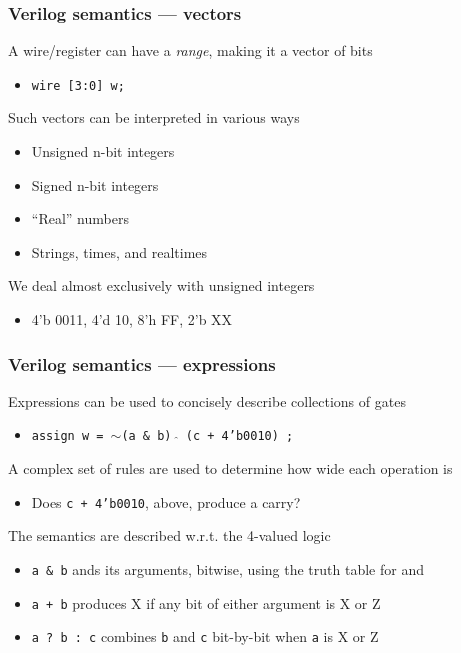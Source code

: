 \documentclass[mathserif]{beamer}
\begin{document}
\begin{frame}
\frametitle{Verilog semantics --- vectors}

A wire/register can have a {\em range}, making it a vector of bits
\begin{itemize}
\item \texttt{wire [3:0] w;}
\end{itemize}

\bigskip

Such vectors can be interpreted in various ways
\begin{itemize}
\item Unsigned n-bit integers
\item Signed n-bit integers
\item ``Real'' numbers
\item Strings, times, and realtimes
\end{itemize}

\bigskip

We deal almost exclusively with unsigned integers
\begin{itemize}
\item 4'b 0011, 4'd 10, 8'h FF, 2'b XX
\end{itemize}

\bigskip




\end{frame}


\begin{frame}
\frametitle{Verilog semantics --- expressions}

Expressions can be used to concisely describe collections of gates
\begin{itemize}
\item \texttt{assign w = $\sim$(a \& b) $\hat{}$ (c + 4'b0010) ;}
\end{itemize}

\bigskip

A complex set of rules are used to determine how wide each operation is
\begin{itemize}
\item Does \texttt{c + 4'b0010}, above, produce a carry?
\end{itemize}

\bigskip

The semantics are described w.r.t. the 4-valued logic
\begin{itemize}
\item \texttt{a \& b} ands its arguments, bitwise, using the truth table for and
\item \texttt{a + b} produces X if any bit of either argument is X or Z
\item \texttt{a~?~b~:~c} combines \texttt{b} and \texttt{c} bit-by-bit when \texttt{a} is X or Z
\end{itemize}

\end{frame}
\end{document}
